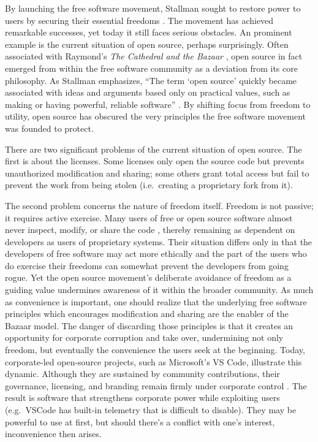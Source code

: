 \documentclass[10pt]{article}
\begin{document}
By launching the free software movement, Stallman sought to restore power to
users by securing their essential freedoms \cite[Essay~1]{stallman.essays}. The
movement has achieved remarkable successes, yet today it still faces serious
obstacles. An prominent example is the current situation of open source,
perhaps surprisingly. Often
associated with Raymond’s \emph{The Cathedral and the Bazaar}
\cite{cathedral.bazaar}, open source in fact emerged from within the free
software community as a deviation from its core philosophy. As Stallman
emphasizes, ``The term `open source' quickly became associated with ideas and
arguments based only on practical values, such as making or having powerful,
reliable software'' \cite[Essay~14]{stallman.essays}. By shifting focus from
freedom to utility, open source has obscured the very principles the free
software movement was founded to protect.

There are two significant problems of the current situation of open source. The
first is about the licenses. Some licenses only open the source code but
prevents unauthorized modification and sharing; some others grant total
access but fail to prevent the work from being stolen (i.e.\ creating a
proprietary fork from it). 

The second problem concerns the nature of freedom itself. Freedom is not
passive; it requires active exercise. Many users of free or open source
software almost never inspect, modify, or share the code
\cite{open.source.contrib}, thereby remaining as dependent on developers as
users of proprietary systems. Their situation differs only in that the
developers of free software may act more ethically and the part of the users
who do exercise their freedoms can somewhat prevent the developers from going
rogue. Yet the open source movement's deliberate avoidance of freedom as a
guiding value undermines awareness of it within the broader community.  As much
as convenience is important, one should realize that the underlying free
software principles which encourages modification and sharing are the enabler
of the Bazaar model. The danger of discarding those principles is that it
creates an opportunity for corporate corruption and take over, undermining not
only freedom, but eventually the convenience the users seek at the beginning.
Today, corporate-led open-source projects, such as Microsoft's VS Code,
illustrate this dynamic. Although they are sustained by community
contributions, their governance, licensing, and branding remain firmly under
corporate control \cite{corporate.open.source, fake.open.source}.  The result
is software that strengthens corporate power while exploiting users (e.g.\
VSCode has built-in telemetry that is difficult to disable). They may be
powerful to use at first, but should there's a conflict with one's interest,
inconvenience then arises. 
\end{document}
